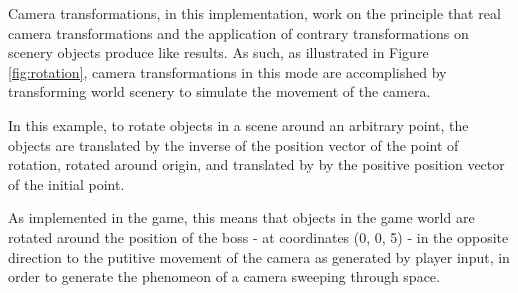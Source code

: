 \documentclass[11pt]{article}
\begin{document}
Camera transformations, in this implementation, work on the principle that real camera
transformations and the application of contrary transformations on scenery objects
produce like results. As such, as illustrated in Figure \ref{fig:rotation}, camera transformations
in this mode are accomplished by transforming world scenery to simulate the movement of the camera.

In this example, to rotate objects in a scene around an arbitrary point, the objects are
translated by the inverse of the position vector of the point of rotation, rotated around
origin, and translated by by the positive position vector of the initial point.

As implemented in the game, this means that objects in the game world are rotated around
the position of the boss - at coordinates (0, 0, 5) - in the opposite direction to the
putitive movement of the camera as generated by player input, in order to generate the
phenomeon of a camera sweeping through space.
\end{document}
